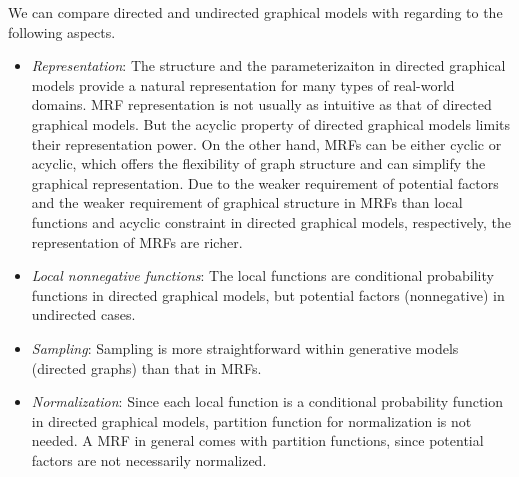 \begin{remark}
  We can compare directed and undirected graphical models with regarding to the following aspects.
  \begin{itemize}
  \item \textit{Representation}: The structure and the parameterizaiton in directed graphical models provide a natural representation for many types of real-world domains. MRF representation is not usually as intuitive as that of directed graphical models. But the acyclic property of directed graphical models limits their representation power. On the other hand, MRFs can be either cyclic or acyclic, which offers the flexibility of graph structure and can simplify the graphical representation. Due to the weaker requirement of potential factors and the weaker requirement of graphical structure in MRFs than local functions and acyclic constraint in directed graphical models, respectively, the representation of MRFs are richer. 
  \item \textit{Local nonnegative functions}: The local functions are conditional probability functions in directed graphical models, but potential factors (nonnegative) in undirected cases.
  \item \textit{Sampling}: Sampling is more straightforward within generative models (directed graphs) than that in MRFs.
  \item \textit{Normalization}: Since each local function is a conditional probability function in directed graphical models, partition function for normalization is not needed. A MRF in general comes with partition functions, since potential factors are not necessarily normalized.
  \end{itemize}
\end{remark}




